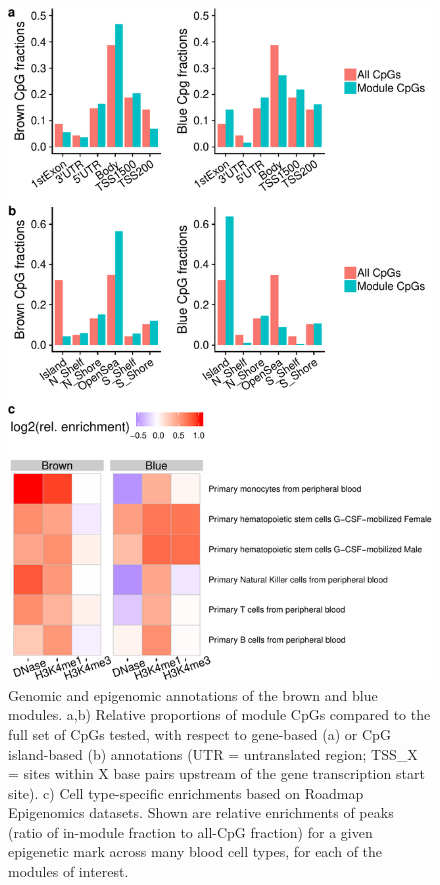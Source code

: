 \documentclass[]{bmcart}
\theoremstyle{definition}
\theoremstyle{definition}
\theoremstyle{definition}
\theoremstyle{remark}
\begin{document}
\begin{figure}[htbp]
\centering
\includegraphics{../doc/module_ewas/figures/brown-and-blue-plots-1.pdf}
\caption{\label{fig:brown-and-blue-plots}Genomic and epigenomic annotations
of the brown and blue modules. a,b) Relative proportions of module CpGs
compared to the full set of CpGs tested, with respect to gene-based (a)
or CpG island-based (b) annotations (UTR = untranslated region; TSS\_X =
sites within X base pairs upstream of the gene transcription start
site). c) Cell type-specific enrichments based on Roadmap Epigenomics
datasets. Shown are relative enrichments of peaks (ratio of in-module
fraction to all-CpG fraction) for a given epigenetic mark across many
blood cell types, for each of the modules of interest.}
\end{figure}
\end{document}
